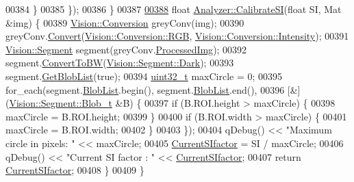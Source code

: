 \begin{DoxyCode}
00384              \}
00385            \});
00386 \}
00387 
\hypertarget{analyzer_8cpp_source_l00388}{}\hyperlink{class_soil_analyzer_1_1_analyzer_a79914fb56b7d9b71ae2fa049329f9413}{00388} \textcolor{keywordtype}{float} \hyperlink{class_soil_analyzer_1_1_analyzer_a79914fb56b7d9b71ae2fa049329f9413}{Analyzer::CalibrateSI}(\textcolor{keywordtype}{float} SI, Mat &img) \{
00389   \hyperlink{class_vision_1_1_conversion}{Vision::Conversion} greyConv(img);
00390   greyConv.\hyperlink{class_vision_1_1_conversion_ac78b687a5b6cdf4c0ae812b5d76b13fc}{Convert}(\hyperlink{class_vision_1_1_conversion_a0a21d4ccbb013185f1974d35ec86e388af3fab43e1e6d8ffab1bf27050866a8d5}{Vision::Conversion::RGB}, 
      \hyperlink{class_vision_1_1_conversion_a0a21d4ccbb013185f1974d35ec86e388abfa5e56d2444f73ce850195468885fdd}{Vision::Conversion::Intensity});
00391   \hyperlink{class_vision_1_1_segment}{Vision::Segment} segment(greyConv.\hyperlink{class_vision_1_1_image_processing_aa7d65742882cd1b2a1e4e9cb68809211}{ProcessedImg});
00392   segment.\hyperlink{class_vision_1_1_segment_a4272ceb22f9cb20c6f65d9536149d3c0}{ConvertToBW}(\hyperlink{class_vision_1_1_segment_ac3ddf2c72ee6333007510b680db1e7dda962a0c0955809f63df036dbd41824c54}{Vision::Segment::Dark});
00393   segment.\hyperlink{class_vision_1_1_segment_a6dba1b8506fe7e8054e99ea5330d4abc}{GetBlobList}(\textcolor{keyword}{true});
00394   \hyperlink{_soil_math_types_8h_a435d1572bf3f880d55459d9805097f62}{uint32\_t} maxCircle = 0;
00395   for\_each(segment.\hyperlink{class_vision_1_1_segment_a74e0600a7dd49bd7110ee27bb4cd6e0e}{BlobList}.begin(), segment.\hyperlink{class_vision_1_1_segment_a74e0600a7dd49bd7110ee27bb4cd6e0e}{BlobList}.end(),
00396            [&](\hyperlink{struct_vision_1_1_segment_1_1_blob}{Vision::Segment::Blob\_t} &B) \{
00397              \textcolor{keywordflow}{if} (B.ROI.height > maxCircle) \{
00398                maxCircle = B.ROI.height;
00399              \}
00400              \textcolor{keywordflow}{if} (B.ROI.width > maxCircle) \{
00401                maxCircle = B.ROI.width;
00402              \}
00403            \});
00404   qDebug() << \textcolor{stringliteral}{"Maximum circle in pixels: "} << maxCircle;
00405   \hyperlink{class_soil_analyzer_1_1_analyzer_a8fb13bb3f69f3f87e1cb61e453c8f5b3}{CurrentSIfactor} = SI / maxCircle;
00406   qDebug() << \textcolor{stringliteral}{"Current SI factor : "} << \hyperlink{class_soil_analyzer_1_1_analyzer_a8fb13bb3f69f3f87e1cb61e453c8f5b3}{CurrentSIfactor};
00407   \textcolor{keywordflow}{return} \hyperlink{class_soil_analyzer_1_1_analyzer_a8fb13bb3f69f3f87e1cb61e453c8f5b3}{CurrentSIfactor};
00408 \}
00409 \}
\end{DoxyCode}

